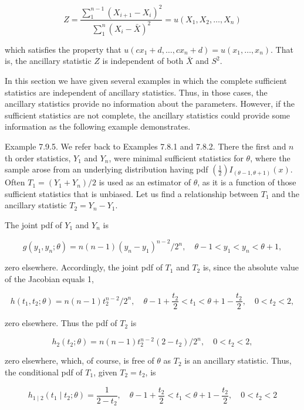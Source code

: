 $$
Z=\frac{\sum_{1}^{n-1}\left(X_{i+1}-X_{i}\right)^{2}}{\sum_{1}^{n}\left(X_{i}-\bar{X}\right)^{2}}=u\left(X_{1}, X_{2}, \ldots, X_{n}\right)
$$

which satisfies the property that $u\left(c x_{1}+d, \ldots, c x_{n}+d\right)=u\left(x_{1}, \ldots, x_{n}\right)$. That is, the ancillary statistic $Z$ is independent of both $\bar{X}$ and $S^{2}$.

In this section we have given several examples in which the complete sufficient statistics are independent of ancillary statistics. Thus, in those cases, the ancillary statistics provide no information about the parameters. However, if the sufficient statistics are not complete, the ancillary statistics could provide some information as the following example demonstrates.

Example 7.9.5. We refer back to Examples 7.8.1 and 7.8.2. There the first and $n$th order statistics, $Y_{1}$ and $Y_{n}$, were minimal sufficient statistics for $\theta$, where the sample arose from an underlying distribution having pdf $\left(\frac{1}{2}\right) I_{(\theta-1, \theta+1)}(x)$. Often $T_{1}=\left(Y_{1}+Y_{n}\right) / 2$ is used as an estimator of $\theta$, as it is a function of those sufficient statistics that is unbiased. Let us find a relationship between $T_{1}$ and the ancillary statistic $T_{2}=Y_{n}-Y_{1}$.

The joint pdf of $Y_{1}$ and $Y_{n}$ is

$$
g\left(y_{1}, y_{n} ; \theta\right)=n(n-1)\left(y_{n}-y_{1}\right)^{n-2} / 2^{n}, \quad \theta-1<y_{1}<y_{n}<\theta+1,
$$

zero elsewhere. Accordingly, the joint pdf of $T_{1}$ and $T_{2}$ is, since the absolute value of the Jacobian equals 1,

$$
h\left(t_{1}, t_{2} ; \theta\right)=n(n-1) t_{2}^{n-2} / 2^{n}, \quad \theta-1+\frac{t_{2}}{2}<t_{1}<\theta+1-\frac{t_{2}}{2}, \quad 0<t_{2}<2,
$$

zero elsewhere. Thus the pdf of $T_{2}$ is

$$
h_{2}\left(t_{2} ; \theta\right)=n(n-1) t_{2}^{n-2}\left(2-t_{2}\right) / 2^{n}, \quad 0<t_{2}<2,
$$

zero elsewhere, which, of course, is free of $\theta$ as $T_{2}$ is an ancillary statistic. Thus, the conditional pdf of $T_{1}$, given $T_{2}=t_{2}$, is

$$
h_{1 \mid 2}\left(t_{1} \mid t_{2} ; \theta\right)=\frac{1}{2-t_{2}}, \quad \theta-1+\frac{t_{2}}{2}<t_{1}<\theta+1-\frac{t_{2}}{2}, \quad 0<t_{2}<2
$$


